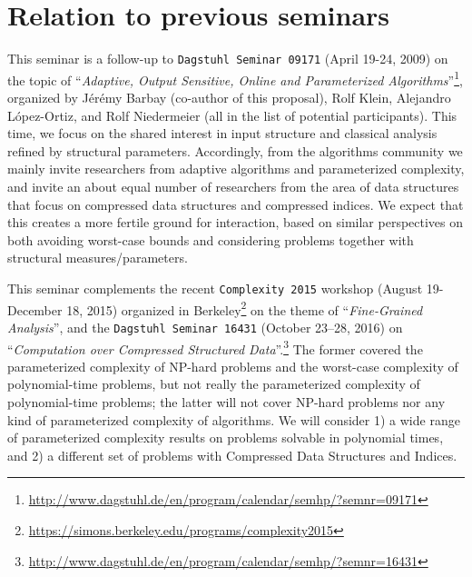 \documentclass[a4paper,10pt]{article}
\begin{document}

\section{Relation to previous seminars}

This seminar is a follow-up to \texttt{Dagstuhl Seminar 09171} (April 19-24, 2009) on the topic of ``\emph{Adaptive, Output Sensitive, Online and Parameterized Algorithms}''\footnote{\url{http://www.dagstuhl.de/en/program/calendar/semhp/?semnr=09171}}, organized by J{\'e}r{\'e}my Barbay (co-author of this proposal), Rolf Klein, Alejandro L\'opez-Ortiz, and Rolf Niedermeier (all in the list of potential participants). This time, we focus on the shared interest in input structure and classical analysis refined by structural parameters. Accordingly, from the algorithms community we mainly invite researchers from adaptive algorithms and parameterized complexity, and invite an about equal number of researchers from the area of data structures that focus on compressed data structures and compressed indices. We expect that this creates a more fertile ground for interaction, based on similar perspectives on both avoiding worst-case bounds and considering problems together with structural measures/parameters.

This seminar complements the recent \texttt{Complexity 2015} workshop (August 19- December 18, 2015) organized in Berkeley\footnote{\url{https://simons.berkeley.edu/programs/complexity2015}} on the theme of ``\emph{Fine-Grained Analysis}'', and the \texttt{Dagstuhl Seminar 16431} (October 23--28, 2016) on ``\emph{Computation over Compressed Structured Data}''.\footnote{\url{http://www.dagstuhl.de/en/program/calendar/semhp/?semnr=16431}} The former covered the parameterized complexity of NP-hard problems and the worst-case complexity of polynomial-time problems, but not really the parameterized complexity of polynomial-time problems; the latter will not cover NP-hard problems nor any kind of parameterized complexity of algorithms.  We will consider 1) a wide range of parameterized complexity results on problems solvable in polynomial times, and 2) a different set of problems with Compressed Data Structures and Indices.
\end{document}
